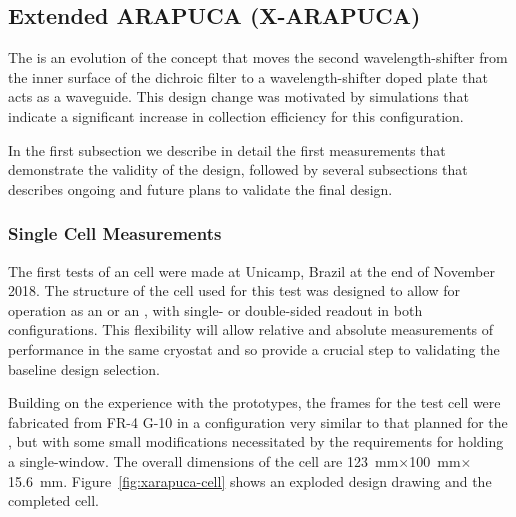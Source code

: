 
\subsection{Extended ARAPUCA (X-ARAPUCA)}
\label{sec:xarapuca-valid}

The  is an evolution of the  concept that moves the second wavelength-shifter from the  inner surface of the dichroic filter to a wavelength-shifter doped plate that acts as a waveguide. This design change was motivated by  simulations that indicate a significant increase in collection efficiency for this configuration. 

In the first subsection we describe in detail the first measurements that demonstrate the validity of the design, followed by several subsections that describes ongoing and future plans to validate the final design.

\subsubsection{Single Cell  Measurements}
\label{sec:xarapuca-unicamp}

The first tests of an  cell were made at Unicamp, Brazil at the end of November 2018. 
The structure of the cell used for this test was designed to allow for operation as an  or an , with single- or double-sided readout in both configurations.  This flexibility will allow relative and absolute measurements of performance in the same cryostat and so provide a crucial step to validating the baseline design selection.

Building on the experience with the  prototypes, the frames for the test cell were fabricated from FR-4 G-10 in a configuration very similar to that planned for the , but with some small modifications necessitated by the requirements for holding a single-window. The overall dimensions of the cell are \SI{123}{mm}$\times$\SI{100}{mm}$\times$\SI{15.6}{mm}. Figure~\ref{fig:xarapuca-cell} shows an exploded design drawing and the completed cell. 

